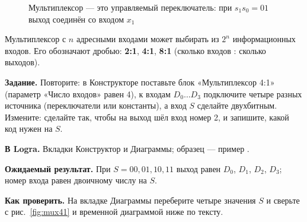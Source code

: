 \begin{figure}[H]
\centering
{}
\caption{Мультиплексор --- это управляемый переключатель: при $s_1s_0 = 01$
выход соединён со входом $x_1$}
\end{figure}

Мультиплексор с $n$ адресными входами может выбирать из $2^n$
информационных входов. Его обозначают дробью: \textbf{2:1}, \textbf{4:1},
\textbf{8:1} (сколько входов : сколько выходов).

\begin{diybox}
\textbf{Задание.}  Повторите: в Конструкторе поставьте блок
«Мультиплексор 4:1» (параметр «Число входов» равен 4), к входам $D_0\ldots D_3$
подключите четыре разных источника (переключатели или константы), а вход $S$
сделайте двухбитным.  Измените: сделайте так, чтобы на выход шёл
вход номер 2, и запишите, какой код нужен на $S$.

\textbf{В Logra.} Вкладки Конструктор и Диаграммы; образец --- пример
.

\textbf{Ожидаемый результат.} При $S=00,01,10,11$ выход равен $D_0$, $D_1$,
$D_2$, $D_3$; номер входа равен двоичному числу на $S$.

\textbf{Как проверить.} На вкладке Диаграммы переберите четыре значения $S$ и
сверьте с рис.~\ref{fig:mux41} и временной диаграммой ниже по тексту.
\end{diybox}

